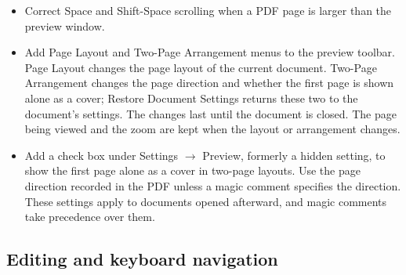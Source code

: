 \documentclass[11pt,letterpaper]{article}
\begin{document}
\begin{itemize}
\item Correct Space and Shift-Space scrolling when a PDF page is larger than the preview window.
\item Add Page Layout and Two-Page Arrangement menus to the preview toolbar. Page Layout changes the page layout of the current document. Two-Page Arrangement changes the page direction and whether the first page is shown alone as a cover; Restore Document Settings returns these two to the document’s settings. The changes last until the document is closed. The page being viewed and the zoom are kept when the layout or arrangement changes.
\item Add a check box under Settings \(\rightarrow\) Preview, formerly a hidden setting, to show the first page alone as a cover in two-page layouts. Use the page direction recorded in the PDF unless a magic comment specifies the direction. These settings apply to documents opened afterward, and magic comments take precedence over them.
\end{itemize}

\subsection{Editing and keyboard navigation}
\end{document}
